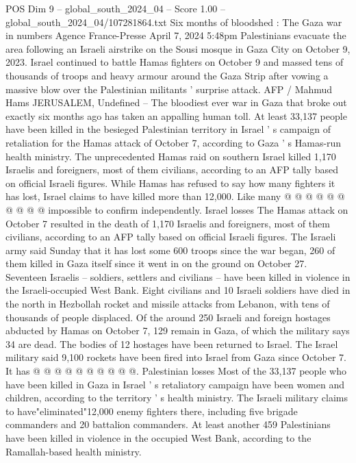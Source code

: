 \begin{textsample}{POS Dim 9 – global\_south\_2024\_04 – Score 1.00 – global\_south\_2024\_04/107281864.txt}  \label{ex:f9_pos_078}
Six months of bloodshed : The Gaza war in numbers Agence France-Presse April 7, 2024 5:48pm Palestinians evacuate the area following an Israeli airstrike on the Sousi mosque in Gaza City on October 9, 2023.
Israel continued to battle Hamas fighters on October 9 and massed tens of thousands of troops and heavy armour around the Gaza Strip after vowing a massive blow over the Palestinian militants ' surprise attack.
AFP / Mahmud Hams JERUSALEM, Undefined -- The bloodiest ever war in Gaza that broke out exactly six months ago has taken an appalling human toll.
At least 33,137 people have been killed in the besieged Palestinian territory in Israel ' s campaign of retaliation for the Hamas attack of October 7, according to Gaza ' s Hamas-run health ministry.
The unprecedented Hamas raid on southern Israel killed 1,170 Israelis and foreigners, most of them civilians, according to an AFP tally based on official Israeli figures.
While Hamas has refused to say how many fighters it has lost, Israel claims to have killed more than 12,000.
Like many @ @ @ @ @ @ @ @ @ @ impossible to confirm independently.
Israel losses The Hamas attack on October 7 resulted in the death of 1,170 Israelis and foreigners, most of them civilians, according to an AFP tally based on official Israeli figures.
The Israeli army said Sunday that it has lost some 600 troops since the war began, 260 of them killed in Gaza itself since it went in on the ground on October 27.
Seventeen Israelis -- soldiers, settlers and civilians -- have been killed in violence in the Israeli-occupied West Bank.
Eight civilians and 10 Israeli soldiers have died in the north in Hezbollah rocket and missile attacks from Lebanon, with tens of thousands of people displaced.
Of the around 250 Israeli and foreign hostages abducted by Hamas on October 7, 129 remain in Gaza, of which the military says 34 are dead.
The bodies of 12 hostages have been returned to Israel.
The Israel military said 9,100 rockets have been fired into Israel from Gaza since October 7.
It has @ @ @ @ @ @ @ @ @ @.
Palestinian losses Most of the 33,137 people who have been killed in Gaza in Israel ' s retaliatory campaign have been women and children, according to the territory ' s health ministry.
The Israeli military claims to have"eliminated"12,000 enemy fighters there, including five brigade commanders and 20 battalion commanders.
At least another 459 Palestinians have been killed in violence in the occupied West Bank, according to the Ramallah-based health ministry.

\end{textsample}
